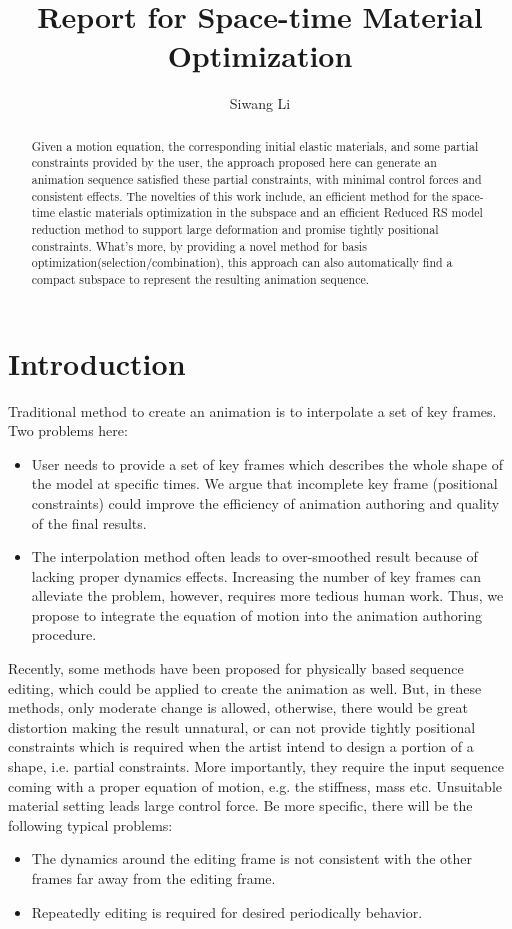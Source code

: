 \documentclass[9pt,twocolumn]{extarticle}
\author{Siwang Li}
\title{Report for Space-time Material Optimization}
\begin{document}
\maketitle

\setlength{\parskip}{0.5ex}
\begin{abstract}
  Given a motion equation, the corresponding initial elastic materials, and some
  partial constraints provided by the user, the approach proposed here can
  generate an animation sequence satisfied these partial constraints, with
  minimal control forces and consistent effects. The novelties of this work
  include, an efficient method for the space-time elastic materials optimization
  in the subspace and an efficient Reduced RS model reduction method to support
  large deformation and promise tightly positional constraints. What's more, by
  providing a novel method for basis optimization(selection/combination), this
  approach can also automatically find a compact subspace to represent the
  resulting animation sequence.
\end{abstract}

\section{Introduction}
Traditional method to create an animation is to interpolate a set of
key frames.  Two problems here:
\begin{itemize}
\item User needs to provide a set of key frames which describes the whole shape
  of the model at specific times.  We argue that incomplete key frame
  (positional constraints) could improve the efficiency of animation authoring
  and quality of the final results.
\item The interpolation method often leads to over-smoothed result because of
  lacking proper dynamics effects.  Increasing the number of key frames can
  alleviate the problem, however, requires more tedious human work. Thus, we
  propose to integrate the equation of motion into the animation authoring
  procedure.
\end{itemize}

Recently, some methods have been proposed for physically based sequence editing,
which could be applied to create the animation as well. But, in these methods,
only moderate change is allowed, otherwise, there would be great distortion
making the result unnatural, or can not provide tightly positional constraints
which is required when the artist intend to design a portion of a shape,
i.e. partial constraints. More importantly, they require the input sequence
coming with a proper equation of motion, e.g. the stiffness, mass etc.
Unsuitable material setting leads large control force.  Be more specific, there
will be the following typical problems:
\begin{itemize}
\item The dynamics around the editing frame is not consistent with the
  other frames far away from the editing frame.
\item Repeatedly editing is required for desired periodically
  behavior.
\end{itemize}
\end{document}
